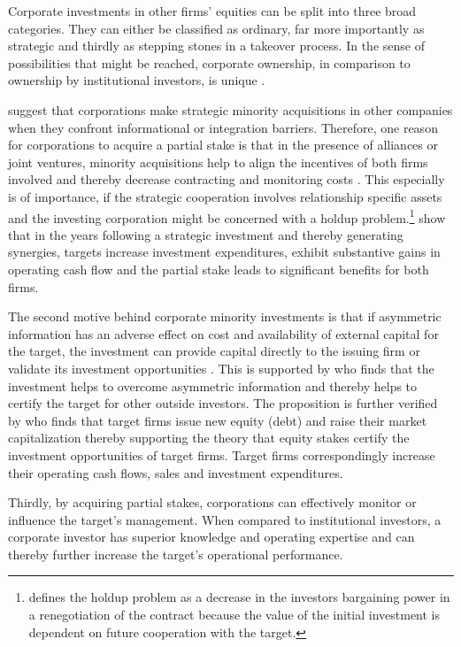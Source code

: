 \documentclass[12pt]{article}
\begin{document}
\noindent Corporate investments in other firms' equities can be split into three broad categories. They can either be classified as ordinary, far more importantly as strategic and thirdly as stepping stones in a takeover process. 
In the sense of possibilities that might be reached, corporate ownership, in comparison to ownership by institutional investors, is unique \citep[p.2791]{Allen2000}.\par
\citet[p.1]{Huang2017} suggest that corporations make strategic minority acquisitions in other companies when they confront informational or integration barriers. 
Therefore, one reason for corporations to acquire a partial stake is that in the presence of alliances or joint ventures, minority acquisitions help to align the incentives of both firms involved and thereby decrease contracting and monitoring costs \citep[p.2792]{Allen2000}. This especially is of importance, if the strategic cooperation involves relationship specific assets and the investing corporation might be concerned with a holdup problem.\footnote{\citet[p.1023]{Ouimet2013} defines the holdup problem as a decrease in the investors bargaining power in a renegotiation of the contract because the value of the initial investment is dependent on future cooperation with the target.} \citet[p. 2793]{Allen2000} show that in the years following a strategic investment and thereby generating synergies,  targets increase investment expenditures, exhibit substantive gains in operating cash flow and the partial stake leads to significant benefits for both firms.\par
The second motive behind corporate minority investments is that if asymmetric information has an adverse effect on cost and availability of external capital for the target, the investment can provide capital directly to the issuing firm or validate its investment opportunities \citep[p.2792]{Allen2000}. This is supported by \citet[p.1038]{Ouimet2013} who finds that the investment helps to overcome asymmetric information and thereby helps to certify the target for other outside investors. The proposition is further verified by \citet[p.78]{Liao2014} who finds that target firms issue new equity (debt) and raise their market capitalization thereby supporting the theory that equity stakes certify the investment opportunities of target firms. Target firms correspondingly increase their operating cash flows, sales and investment expenditures.\par
Thirdly, by acquiring partial stakes, corporations can effectively monitor or influence the target's management. When compared to institutional investors, a corporate investor has superior knowledge and operating expertise \citep[p.2792]{Allen2000} and can thereby further increase the target's operational performance.\par
\end{document}
